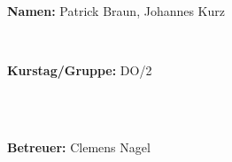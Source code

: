 \documentclass[12pt,a4paper]{article}
\begin{document}
\begin{verbatim}
\end{verbatim}
		\begin{flushleft}
			\textbf{\Large{Namen:}} \Large{Patrick Braun, Johannes Kurz}
			\end{flushleft}

\begin{verbatim}


\end{verbatim}
			\begin{flushleft}
			\textbf{\Large{Kurstag/Gruppe:}} \Large{DO/2}
			\end{flushleft}

\begin{verbatim}



\end{verbatim}
			\begin{flushleft}
			\LARGE{\textbf{Betreuer:}}	\Large{ Clemens Nagel }	
			\end{flushleft}
\end{document}
